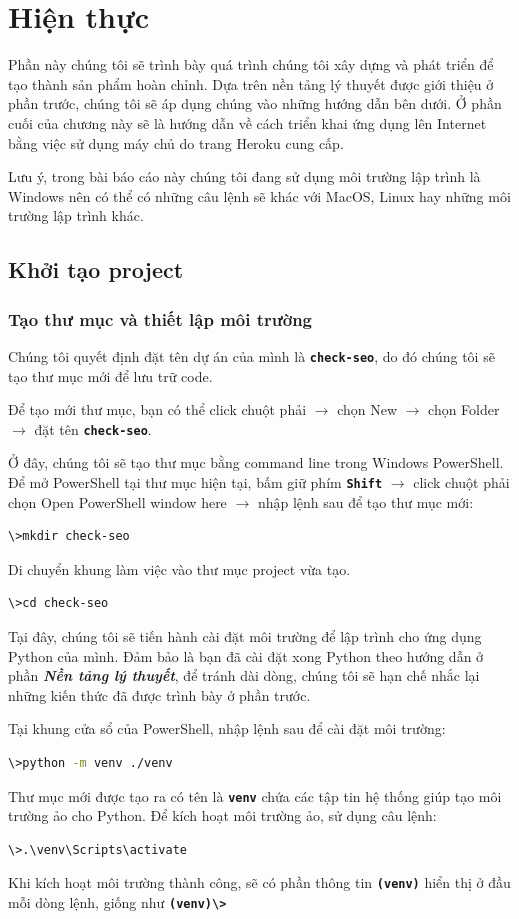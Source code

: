 \chapter{Hiện thực}
Phần này chúng tôi sẽ trình bày quá trình chúng tôi xây dựng và phát triển để tạo thành sản phẩm hoàn chỉnh. Dựa trên nền tảng lý thuyết được giới thiệu ở phần trước, chúng tôi sẽ áp dụng chúng vào những hướng dẫn bên dưới. Ở phần cuối của chương này sẽ là hướng dẫn về cách triển khai ứng dụng lên Internet bằng việc sử dụng máy chủ do trang Heroku cung cấp.
\par
Lưu ý, trong bài báo cáo này chúng tôi đang sử dụng môi trường lập trình là Windows nên có thể có những câu lệnh sẽ khác với MacOS, Linux hay những môi trường lập trình khác.
\section{Khởi tạo project}
\subsection{Tạo thư mục và thiết lập môi trường}
Chúng tôi quyết định đặt tên dự án của mình là \textbf{\texttt{check-seo}}, do đó chúng tôi sẽ tạo thư mục mới để lưu trữ code.
\par
Để tạo mới thư mục, bạn có thể click chuột phải $\rightarrow$ chọn New $\rightarrow$ chọn Folder $\rightarrow$ đặt tên \textbf{\texttt{check-seo}}.
\par
Ở đây, chúng tôi sẽ tạo thư mục bằng command line trong Windows PowerShell. Để mở PowerShell tại thư mục hiện tại, bấm giữ phím \textbf{\texttt{Shift}} $\rightarrow$ click chuột phải chọn Open PowerShell window here $\rightarrow$ nhập lệnh sau để tạo thư mục mới:
\begin{lstlisting}[language=bash]
\>mkdir check-seo
\end{lstlisting}
\par
Di chuyển khung làm việc vào thư mục project vừa tạo.
\begin{lstlisting}[language=bash]
\>cd check-seo
\end{lstlisting}
\par
Tại đây, chúng tôi sẽ tiến hành cài đặt môi trường để lập trình cho ứng dụng Python của mình. Đảm bảo là bạn đã cài đặt xong Python theo hướng dẫn ở phần \textbf{\textit{Nền tảng lý thuyết}}, để tránh dài dòng, chúng tôi sẽ hạn chế nhắc lại những kiến thức đã được trình bày ở phần trước.
\par
Tại khung cửa sổ của PowerShell, nhập lệnh sau để cài đặt môi trường:
\begin{lstlisting}[language=bash]
\>python -m venv ./venv
\end{lstlisting}
\par
Thư mục mới được tạo ra có tên là \textbf{\texttt{venv}} chứa các tập tin hệ thống giúp tạo môi trường ảo cho Python. Để kích hoạt môi trường ảo, sử dụng câu lệnh:
\begin{lstlisting}[language=bash]
\>.\venv\Scripts\activate
\end{lstlisting}
\par
Khi kích hoạt môi trường thành công, sẽ có phần thông tin \textbf{\texttt{(venv)}} hiển thị ở đầu mỗi dòng lệnh, giống như \textbf{\texttt{(venv)\textbackslash>}}
